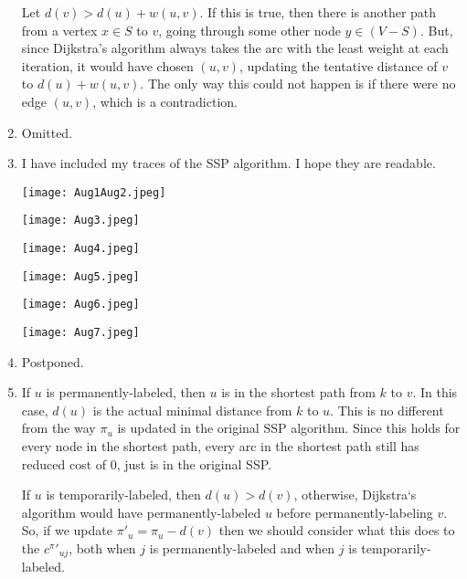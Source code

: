 \documentclass[12pt]{article}
\begin{document}
\begin{enumerate}
        Let $d(v)>d(u)+w(u,v)$. If this is true, then there is another path
        from a vertex $x\in S$ to $v$, going through some other node
        $y\in(V-S)$.  But, since Dijkstra's algorithm always takes the arc with
        the least weight at each iteration, it would have chosen $(u,v)$,
        updating the tentative distance of $v$ to $d(u)+w(u,v)$. The only way
        this could not happen is if there were no edge $(u,v)$, which is a
        contradiction.\\
    \item Omitted.\\
    \item
        I have included my traces of the SSP algorithm. I hope they are
        readable.

        \texttt{[image: Aug1Aug2.jpeg]}

        \texttt{[image: Aug3.jpeg]}

        \texttt{[image: Aug4.jpeg]}

        \texttt{[image: Aug5.jpeg]}

        \texttt{[image: Aug6.jpeg]}

        \texttt{[image: Aug7.jpeg]}
    \item Postponed.\\
    \item
        If $u$ is permanently-labeled, then $u$ is in the shortest path from
        $k$ to $v$. In this case, $d(u)$ is the actual minimal distance from
        $k$ to $u$. This is no different from the way $\pi_u$ is updated in the
        original SSP algorithm. Since this holds for every node in the shortest
        path, every arc in the shortest path still has reduced cost of 0, just
        is in the original SSP.

        If $u$ is temporarily-labeled, then $d(u)>d(v)$, otherwise, Dijkstra`s
        algorithm would have permanently-labeled $u$ before permanently-labeling
        $v$. So, if we update $\pi'_u=\pi_u-d(v)$ then we should consider what
        this does to the $c^\pi{'}_{uj}$, both when $j$ is permanently-labeled
        and when $j$ is temporarily-labeled.


\end{enumerate}
\end{document}
